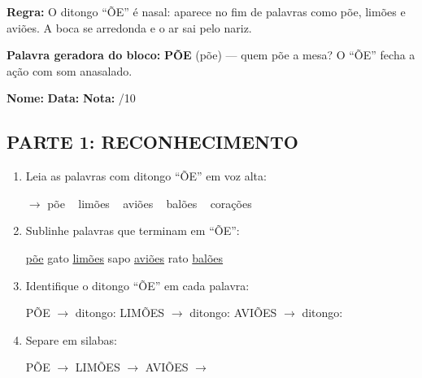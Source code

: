 
\textbf{Regra:} O ditongo ``\~OE'' \'e nasal: aparece no fim de palavras como p\~oe, lim\~oes e avi\~oes. A boca se arredonda e o ar sai pelo nariz.

\textbf{Palavra geradora do bloco:} \textbf{P\~OE} (p\~oe) --- quem p\~oe a mesa? O ``\~OE'' fecha a a\c{c}\~ao com som anasalado.

\begin{exercicio}
\noindent\textbf{Nome:} \underline{\hspace{3.2cm}} \quad \textbf{Data:} \underline{\hspace{1.6cm}} \quad \textbf{Nota:} \underline{\hspace{0.9cm}}/10

\subsection*{PARTE 1: RECONHECIMENTO}

\begin{enumerate}
  \item Leia as palavras com ditongo ``\~OE'' em voz alta:
  \begin{center}
  $\rightarrow$ p\~oe  ~  lim\~oes  ~  avi\~oes  ~  bal\~oes  ~  cora\c{c}\~oes
  \end{center}

  \item Sublinhe palavras que terminam em ``\~OE'':
  \begin{center}
  \uline{p\~oe} \quad gato \quad \uline{lim\~oes} \quad sapo \quad \uline{avi\~oes} \quad rato \quad \uline{bal\~oes}
  \end{center}

  \item Identifique o ditongo ``\~OE'' em cada palavra:
  \begin{center}
  P\~OE $\rightarrow$ ditongo: \underline{\hspace{1cm}} \quad LIM\~OES $\rightarrow$ ditongo: \underline{\hspace{1cm}} \quad AVI\~OES $\rightarrow$ ditongo: \underline{\hspace{1cm}}
  \end{center}

  \item Separe em silabas:
  \begin{center}
  P\~OE $\rightarrow$ \underline{\hspace{1cm}} \quad LIM\~OES $\rightarrow$ \underline{\hspace{1cm}} \quad AVI\~OES $\rightarrow$ \underline{\hspace{1cm}} \underline{\hspace{1cm}} \underline{\hspace{1cm}}
  \end{center}


\end{enumerate}
\end{exercicio}
